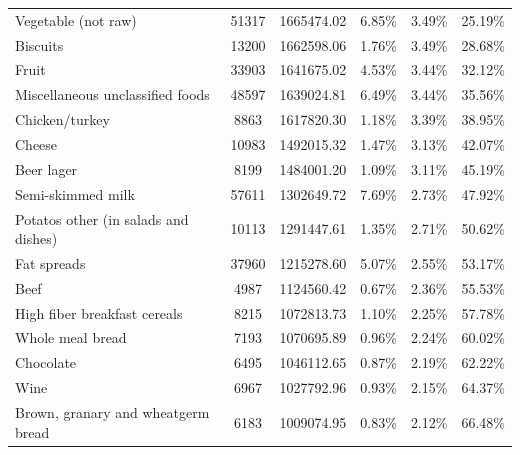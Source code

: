 \documentclass[utf8]{frontiersSCNS}
\begin{document}
\begin{table}[h!]
{\begin{tabular}{lccccc}
        Vegetable (not raw)                                 & 51317 & 1665474.02 & 6.85\%        & 3.49\%   & 25.19\%      \\
        Biscuits                                            & 13200 & 1662598.06 & 1.76\%        & 3.49\%   & 28.68\%      \\
        Fruit                                               & 33903 & 1641675.02 & 4.53\%        & 3.44\%   & 32.12\%      \\
        Miscellaneous unclassified foods                    & 48597 & 1639024.81 & 6.49\%        & 3.44\%   & 35.56\%      \\
        Chicken/turkey                                      & 8863  & 1617820.30 & 1.18\%        & 3.39\%   & 38.95\%      \\
        Cheese                                              & 10983 & 1492015.32 & 1.47\%        & 3.13\%   & 42.07\%      \\
        Beer lager                                          & 8199  & 1484001.20 & 1.09\%        & 3.11\%   & 45.19\%      \\
        Semi-skimmed milk                                   & 57611 & 1302649.72 & 7.69\%        & 2.73\%   & 47.92\%      \\
        Potatos other (in salads and dishes)                & 10113 & 1291447.61 & 1.35\%        & 2.71\%   & 50.62\%      \\
        Fat spreads                                         & 37960 & 1215278.60 & 5.07\%        & 2.55\%   & 53.17\%      \\
        Beef                                                & 4987  & 1124560.42 & 0.67\%        & 2.36\%   & 55.53\%      \\
        High fiber breakfast cereals                        & 8215  & 1072813.73 & 1.10\%        & 2.25\%   & 57.78\%      \\
        Whole meal bread                                    & 7193  & 1070695.89 & 0.96\%        & 2.24\%   & 60.02\%      \\
        Chocolate                                           & 6495  & 1046112.65 & 0.87\%        & 2.19\%   & 62.22\%      \\
        Wine                                                & 6967  & 1027792.96 & 0.93\%        & 2.15\%   & 64.37\%      \\
        Brown, granary and wheatgerm bread                  & 6183  & 1009074.95 & 0.83\%        & 2.12\%   & 66.48\%      \\

\end{tabular}}
\end{table}
\end{document}
